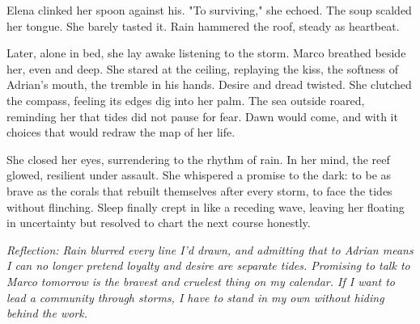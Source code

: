 Elena clinked her spoon against his. "To surviving," she echoed. The soup scalded her tongue. She barely tasted it. Rain hammered the roof, steady as heartbeat.

Later, alone in bed, she lay awake listening to the storm. Marco breathed beside her, even and deep. She stared at the ceiling, replaying the kiss, the softness of Adrian's mouth, the tremble in his hands. Desire and dread twisted. She clutched the compass, feeling its edges dig into her palm. The sea outside roared, reminding her that tides did not pause for fear. Dawn would come, and with it choices that would redraw the map of her life.

She closed her eyes, surrendering to the rhythm of rain. In her mind, the reef glowed, resilient under assault. She whispered a promise to the dark: to be as brave as the corals that rebuilt themselves after every storm, to face the tides without flinching. Sleep finally crept in like a receding wave, leaving her floating in uncertainty but resolved to chart the next course honestly.


\noindent\textit{Reflection: Rain blurred every line I'd drawn, and admitting that to Adrian means I can no longer pretend loyalty and desire are separate tides. Promising to talk to Marco tomorrow is the bravest and cruelest thing on my calendar. If I want to lead a community through storms, I have to stand in my own without hiding behind the work.}
